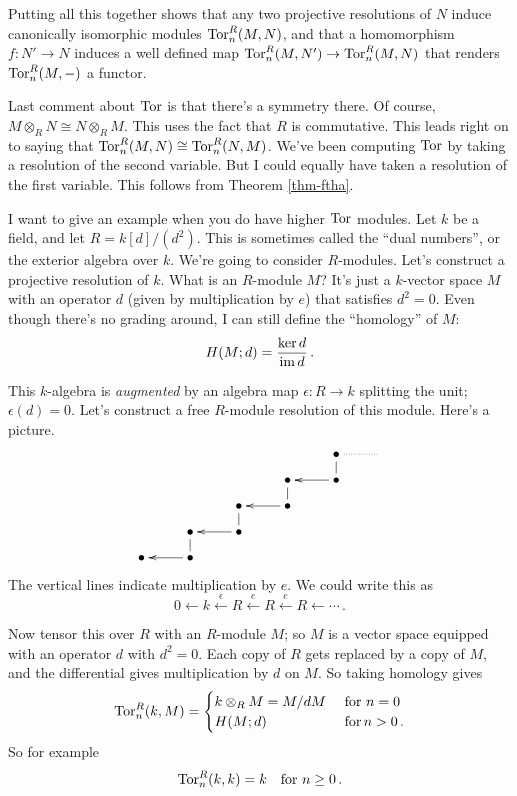 Putting all this together shows that any two projective resolutions of $N$ 
induce canonically isomorphic modules $\operatorname{Tor}_n^R(M,N)$, and that a homomorphism
$f:N'\to N$ induces a well defined map $\operatorname{Tor}_n^R(M,N')\to\operatorname{Tor}_n^R(M,N)$
that renders $\operatorname{Tor}^R_n(M,-)$ a functor. 

Last comment about $\operatorname{Tor}$ is that there's a symmetry there. Of course, $M\otimes_R N\cong N\otimes_R M$. This uses the fact that $R$ is commutative. This leads right on to saying that $\operatorname{Tor}^R_n(M,N)\cong \operatorname{Tor}^R_n(N,M)$. We've been computing $\operatorname{Tor}$ by taking a resolution of the second variable. But I could equally have taken a resolution of the first variable. This follows from Theorem
\ref{thm-ftha}.


\begin{example}
I want to give an example when you do have higher $\operatorname{Tor}$ modules. Let $k$ be a field, and let $R=k[d]/(d^2)$. This is sometimes called the ``dual numbers'', or the exterior algebra over $k$. We're going to consider $R$-modules. Let's construct a projective resolution of $k$. What is an $R$-module $M$? It's just a $k$-vector space $M$ with an operator $d$ (given by multiplication by $e$) that satisfies $d^2=0$. Even though there's no grading around, I can still define the ``homology'' of $M$:
\[
H(M;d)=\frac{\ker d}{\operatorname{im} d}\,.
\]

This $k$-algebra is {\em augmented} by an algebra map $\epsilon:R\to k$ splitting the unit; $\epsilon(d)=0$. Let's construct a free $R$-module resolution of this module. Here's a picture.
\[
\xymatrix@R=8pt{
&&&& \bullet \ar@{..}[r] \ar@{-}[d] & \\
&&& \bullet \ar@{-}[d] & \bullet \ar[l]  \\
&& \bullet \ar@{-}[d] & \bullet \ar[l] \\
& \bullet \ar@{-}[d] & \bullet \ar[l] \\
\bullet & \bullet \ar[l]
}\]
The vertical lines indicate multiplication by $e$. We could write this as
\[
0\leftarrow 
k\xleftarrow{\epsilon}R\xleftarrow{e}R\xleftarrow{e}R\leftarrow\cdots\,.
\]

Now tensor this over $R$ with an $R$-module $M$; so $M$ is a vector space 
equipped with an operator $d$ with $d^2=0$. Each copy of $R$ gets replaced by
a copy of $M$, and the differential gives multiplication by $d$ on $M$. So 
taking homology gives 
\[
\operatorname{Tor}^R_n(k,M)=
\begin{cases}k\otimes_RM=M/dM\,&\,\hbox{for}\,\,n=0\\
H(M;d)\,&\,\hbox{for}\,n>0\,.
\end{cases}
\]
So for example 
\[
\operatorname{Tor}^R_n(k,k)=k\quad\hbox{for}\,\,n\geq0\,.
\]
\end{example}

